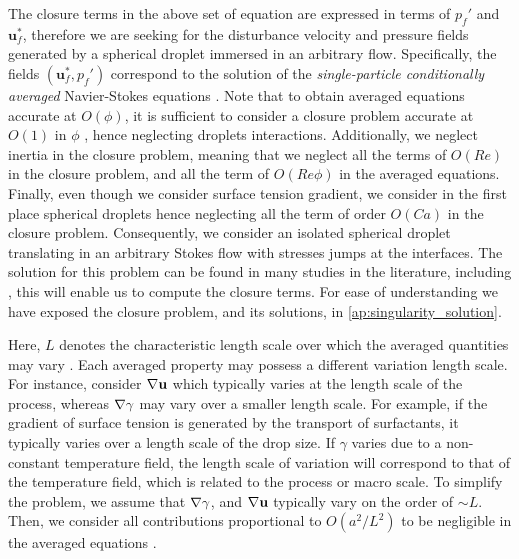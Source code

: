The closure terms in the above set of equation are expressed in terms of $p_f'$ and $\textbf{u}_f^*$, therefore we are seeking for the disturbance velocity and pressure fields generated by a spherical droplet immersed in an arbitrary flow. 
Specifically, the fields $(\textbf{u}_f^*,p_f')$ correspond to the solution of the 
 \textit{single-particle conditionally averaged} Navier-Stokes equations \citep{hinch1977averaged,zhang1994averaged,fintzi2025}. 
Note that to obtain averaged equations accurate at $O(\phi)$, it is sufficient to consider a closure problem accurate at $O(1)$  in $\phi$ \citep{hinch1977averaged,zhang1994averaged}, hence neglecting droplets interactions.
Additionally, we neglect inertia in the closure problem, meaning that we neglect all the terms of $O(Re)$ in the closure problem, and all the term of $O(Re\phi)$ in the averaged equations. 
Finally, even though we consider surface tension gradient, we consider in the first place spherical droplets hence neglecting all the term of order $O(Ca)$ in the closure problem. 
Consequently, we consider an isolated spherical droplet translating in an arbitrary Stokes flow with stresses jumps at the interfaces.
The solution for this problem can be found in many studies in the literature, including \citet{
    Subramanian_1985,
    nadim1991motion,
    pozrikidis1992boundary,leal2007advanced,raja2010inertial,pozrikidis2011introduction,kim2013microhydrodynamics}, this will enable us to compute the closure terms.
For ease of understanding we have exposed the closure problem, and its solutions, in \ref{ap:singularity_solution}. 


Here, $L$ denotes the characteristic length scale over which the averaged quantities may vary \citep{jackson1997locally}. 
Each averaged property may possess a different variation length scale.
For instance, consider $\mathbf{\nabla} \textbf{u}$ which typically varies at the length scale of the process, whereas $\mathbf{\nabla}\gamma$ may vary over a smaller length scale. 
For example, if the gradient of surface tension is generated by the transport of surfactants, it typically varies over a length scale of the drop size. 
If $\gamma$ varies due to a non-constant temperature field, the length scale of variation will correspond to that of the temperature field, which is related to the process or macro scale. 
To simplify the problem, we assume that $\mathbf{\nabla}\gamma$, and $\mathbf{\nabla} \textbf{u}$ typically vary on the order of $\sim L$. 
Then, we consider all contributions proportional to $O(a^2/L^2)$ to be negligible in the averaged equations \citep{jackson1997locally,zhang1997momentum}. 



